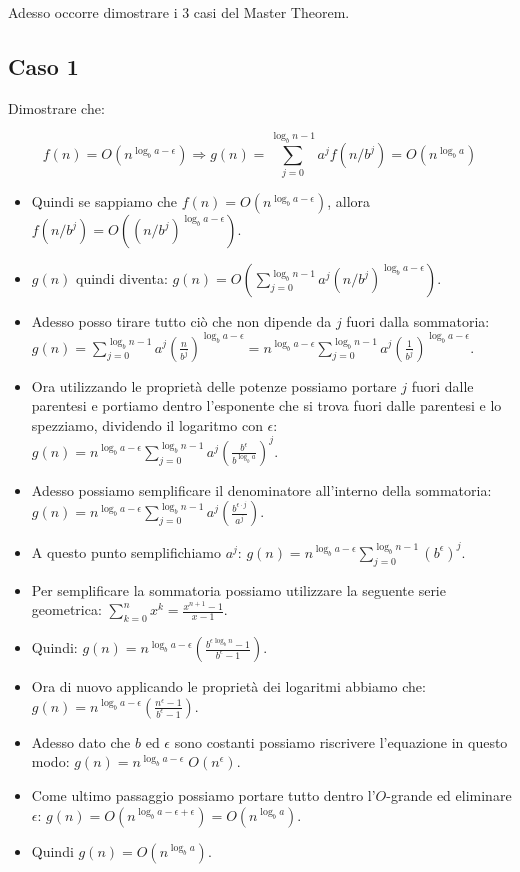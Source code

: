 \documentclass{article}
\begin{document}
Adesso occorre dimostrare i 3 casi del Master Theorem.

\subsection{Caso 1}

Dimostrare che:

\begin{equation*}
    f(n) = O(n^{\log_{b}a - \epsilon}) \Rightarrow g(n) = \sum_{j = 0}^{\log_{b}n - 1} a^j f(n/b^j) = O(n^{\log_{b}a})
\end{equation*}

\begin{itemize}
    \item Quindi se sappiamo che $f(n) = O(n^{\log_{b}a - \epsilon})$, allora $f(n/b^j) = O((n/b^j)^{\log_{b}a - \epsilon})$.
    \item $g(n)$ quindi diventa: $\displaystyle g(n) = O(\sum_{j = 0}^{\log_{b}n - 1} a^j(n/b^j)^{\log_{b} a - \epsilon})$.
    \item Adesso posso tirare tutto ciò che non dipende da $j$ fuori dalla sommatoria: $\displaystyle g(n) = \sum_{j = 0}^{\log_{b}n - 1} a^j(\frac{n}{b^j})^{\log_{b} a - \epsilon} = n^{\log_{b}a - \epsilon} \sum_{j = 0}^{\log_{b}n - 1} a^j(\frac{1}{b^j})^{\log_{b} a - \epsilon}$.
    \item Ora utilizzando le proprietà delle potenze possiamo portare $j$ fuori dalle parentesi e portiamo dentro l'esponente che si trova fuori dalle parentesi e lo spezziamo, dividendo il logaritmo con $\epsilon$: $\displaystyle g(n) = n^{\log_{b}a - \epsilon} \sum_{j = 0}^{\log_{b}n - 1} a^j (\frac{b^{\epsilon}}{b^{\log_{b}a}})^j$.
    \item Adesso possiamo semplificare il denominatore all'interno della sommatoria: $\displaystyle g(n) = n^{\log_{b}a - \epsilon} \sum_{j = 0}^{\log_{b} n - 1} a^j (\frac{b^{\epsilon \cdot j}}{a^j})$.
    \item A questo punto semplifichiamo $a^j$: $\displaystyle g(n) = n^{\log_{b}a - \epsilon} \sum_{j = 0}^{\log_{b} n - 1} (b^{\epsilon})^j$.
    \item Per semplificare la sommatoria possiamo utilizzare la seguente serie geometrica: $\displaystyle \sum_{k = 0}^n x^k = \frac{x^{n + 1} - 1}{x - 1}$.
    \item Quindi: $g(n) = n^{\log_{b}a - \epsilon} (\frac{b^{\epsilon \log_{b} n} - 1}{b^{\epsilon} - 1})$.
    \item Ora di nuovo applicando le proprietà dei logaritmi abbiamo che: $g(n) = n^{\log_{b}a - \epsilon} (\frac{n^{\epsilon} - 1}{b^{\epsilon} - 1})$.
    \item Adesso dato che $b$ ed $\epsilon$ sono costanti possiamo riscrivere l'equazione in questo modo: $g(n) = n^{\log_{b}a - \epsilon} \; O(n^{\epsilon})$.
    \item Come ultimo passaggio possiamo portare tutto dentro l'$O$-grande ed eliminare $\epsilon$: $g(n) = O(n^{\log_{b}a - \epsilon + \epsilon}) = O(n^{\log_{b} a})$.
    \item Quindi $g(n) = O(n^{\log_{b} a})$.
\end{itemize}
\end{document}
